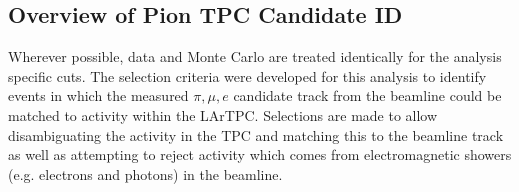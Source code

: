 

\subsection{Overview of Pion TPC Candidate ID}\label{sec:TPCCandidateSelect}
Wherever possible, data and Monte Carlo are treated identically for the analysis specific cuts. The selection criteria were developed for this analysis to identify events in which the measured $\pi, \mu, e$ candidate track from the beamline could be matched to activity within the LArTPC. Selections are made to allow disambiguating the activity in the TPC and matching this to the beamline track as well as attempting to reject activity which comes from electromagnetic showers (e.g. electrons and photons) in the beamline.


